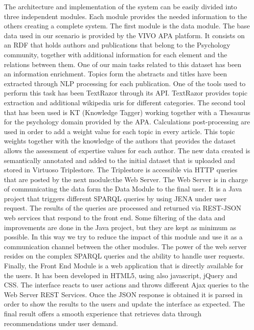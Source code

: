 The architecture and implementation of the system can be easily divided into three independent modules. Each module provides the needed information to the others creating a complete system.
The first module is the data module. The base data used in our scenario is provided by the VIVO APA platform. It consists on an RDF that holds authors and publications that belong to the Psychology community, together with additional information for each element and the relations between them. One of our main tasks related to this dataset has been an information enrichment. Topics form the abstracts and titles have been extracted through NLP processing for each publication. One of the tools used to perform this task has been TextRazor through its API. TextRazor provides topic extraction and additional wikipedia uris for different categories. The second tool that has been used is KT (Knowledge Tagger) working together with a Thesaurus for the psychology domain provided by the APA. Calculations post-processing are used in order to add a weight value for each topic in every article. This topic weights together with the knowledge of the authors that provides the dataset allows the assessment of expertise values for each author. The new data created is semantically annotated and added to the initial dataset that is uploaded and stored in Virtuoso Triplestore. The Triplestore is accessible via HTTP queries that are posted by the next module:the Web Server.
The Web Server is in charge of communicating the data form the Data Module to the final user. It is a Java project that triggers different SPARQL queries by using JENA under user request. The results of the queries are processed and returned via REST-JSON web services that respond to the front end. Some filtering of the data and improvements are done in the Java project, but they are kept as minimum as possible. In this way we try to reduce the impact of this module and use it as a communication channel between the other modules. The power of the web server resides on the complex SPARQL queries and the ability to handle user requests.
Finally, the Front End Module is a web application that is directly available for the users. It has been developed in HTML5, using also javascript, jQuery and CSS. The interface reacts to user actions and throws different Ajax queries to the Web Server REST Services. Once the JSON response is obtained it is parsed in order to show the results to the users and update the interface as expected. The final result offers a smooth experience that retrieves data through recommendations under user demand. 

